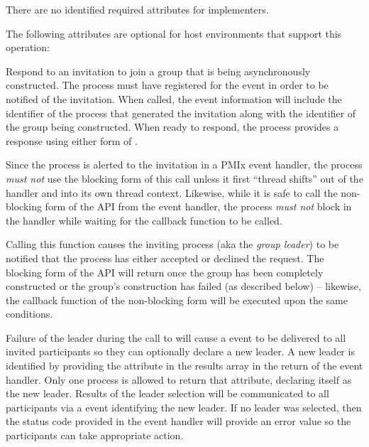 \returnsimple

\reqattrstart
There are no identified required attributes for implementers.

\reqattrend

\optattrstart
The following attributes are optional for host environments that support this operation:


\optattrend

\descr

Respond to an invitation to join a group that is being asynchronously constructed. The process must have registered for the  event in order to be notified of the invitation. When called, the event information will include the  identifier of the process that generated the invitation along with the identifier of the group being constructed. When ready to respond, the process provides a response using either form of .

\adviceuserstart
Since the process is alerted to the invitation in a \ac{PMIx} event handler, the process \emph{must not} use the blocking form of this call unless it first ``thread shifts'' out of the handler and into its own thread context. Likewise, while it is safe to call the non-blocking form of the \ac{API} from the event handler, the process \emph{must not} block in the handler while waiting for the callback function to be called.
\adviceuserend

Calling this function causes the inviting process (aka the \emph{group leader}) to be notified that the process has either accepted or declined the request. The blocking form of the \ac{API} will return once the group has been completely constructed or the group’s construction has failed (as described below) – likewise, the callback function of the non-blocking form will be executed upon the same conditions.

Failure of the leader during the call to  will cause a  event to be delivered to all invited participants so they can optionally declare a new leader. A new leader is identified by providing the  attribute in the results array in the return of the event handler. Only one process is allowed to return that attribute, declaring itself as the new leader. Results of the leader selection will be communicated to all participants via a  event identifying the new leader. If no leader was selected, then the status code provided in the event handler will provide an error value so the participants can take appropriate action.

